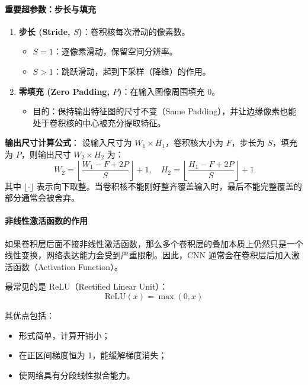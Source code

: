 \paragraph{重要超参数：步长与填充}
\begin{enumerate}
    \item \textbf{步长 (Stride, $S$)}：卷积核每次滑动的像素数。
    \begin{itemize}
        \item $S=1$：逐像素滑动，保留空间分辨率。
        \item $S>1$：跳跃滑动，起到下采样（降维）的作用。
    \end{itemize}

    \item \textbf{零填充 (Zero Padding, $P$)}：在输入图像周围填充 0。
    \begin{itemize}
        \item 目的：保持输出特征图的尺寸不变（Same Padding），并让边缘像素也能处于卷积核的中心被充分提取特征。
    \end{itemize}
\end{enumerate}

\textbf{输出尺寸计算公式}：
设输入尺寸为 $W_1 \times H_1$，卷积核大小为 $F$，步长为 $S$，填充为 $P$，则输出尺寸 $W_2 \times H_2$ 为：
\begin{equation}
    W_2 = \left\lfloor \frac{W_1 - F + 2P}{S} \right\rfloor + 1,
    \quad
    H_2 = \left\lfloor \frac{H_1 - F + 2P}{S} \right\rfloor + 1
\end{equation}
其中 $\lfloor \cdot \rfloor$ 表示向下取整。当卷积核不能刚好整齐覆盖输入时，最后不能完整覆盖的部分通常会被舍弃。

\paragraph{非线性激活函数的作用}

如果卷积层后面不接非线性激活函数，那么多个卷积层的叠加本质上仍然只是一个线性变换，网络表达能力会受到严重限制。因此，CNN 通常会在卷积层后加入激活函数（Activation Function）。

最常见的是 ReLU（Rectified Linear Unit）：
\begin{equation}
\text{ReLU}(x) = \max(0, x)
\end{equation}

其优点包括：
\begin{itemize}
    \item 形式简单，计算开销小；
    \item 在正区间梯度恒为 1，能缓解梯度消失；
    \item 使网络具有分段线性拟合能力。
\end{itemize}

